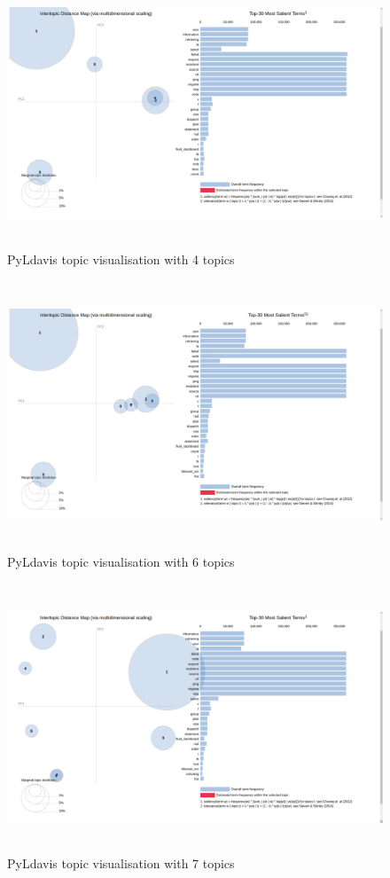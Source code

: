   \begin{figure}[!h]
    \centering
    \includegraphics[width=15cm, height=8cm,trim=0 0 100px 0, clip=true]{figures/pyldavis/pyldavis_5.png}
    \caption{PyLdavis topic visualisation with 4 topics}
    \label{fig:appendices:pyldavis_5}
\end{figure}
 
 \begin{figure}[!h]
    \centering
    \includegraphics[width=15cm, height=8cm,trim=0 0 100px 0, clip=true]{figures/pyldavis/pyldavis_6.png}
    \caption{PyLdavis topic visualisation with 6 topics}
    \label{fig:pyldavis_6}
\end{figure}

 \begin{figure}[!h]
    \centering
    \includegraphics[width=15cm, height=8cm,trim=0 0 100px 0, clip=true]{figures/pyldavis/pyldavis_7.png}
    \caption{PyLdavis topic visualisation with 7 topics}
    \label{fig:pyldavis_7}
\end{figure}

